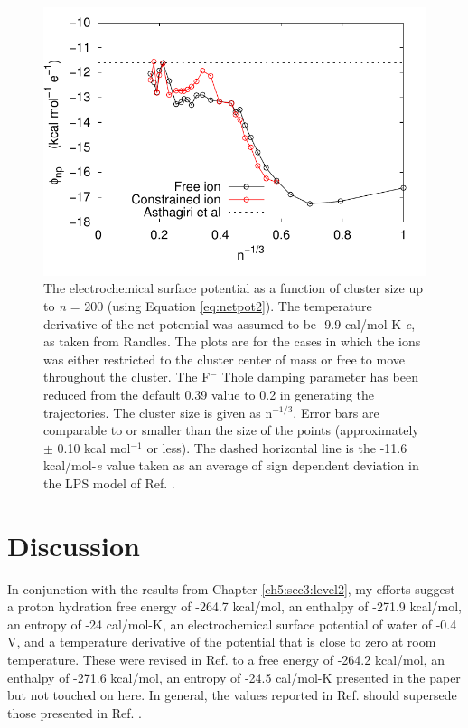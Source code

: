 \begin{cpa}
\begin{figure}
 \begin{center}
  \includegraphics[width=0.98\linewidth]{images/cpa/net_pot-eps-converted-to.pdf}
 \end{center}
\caption[Net potential assuming experimental temperature derivative]{The electrochemical surface potential as a function of cluster size up to \emph{n} = 200 (using Equation 
\ref{eq:netpot2}). The temperature derivative of the net potential was assumed to be -9.9 cal/mol-K-\emph{e}, as taken from Randles\cite{randles1977structure}. The plots 
are for the cases in which the ions was either restricted to the cluster center of mass or free to move throughout the cluster. The F$^{-}$ Thole damping parameter has
been reduced from the default 0.39 value to 0.2 in generating the trajectories. The cluster size is given as n$^{-1/3}$. Error bars are comparable to or smaller than 
the size of the points (approximately $\pm$ 0.10 kcal mol$^{-1}$ or less). The dashed horizontal line is the -11.6 kcal/mol-\emph{e} value taken as an average of sign dependent
deviation in the LPS model of Ref. \cite{ashbaugh2008lps}.}
\label{fig:netpotlps}
\end{figure}

  \section{\label{ch5:sec4:level1}Discussion~}
  In conjunction with the results from Chapter \ref{ch5:sec3:level2}, my efforts suggest a proton hydration free energy of -264.7 kcal/mol, an enthalpy of -271.9 kcal/mol, an 
  entropy of -24 cal/mol-K, an electrochemical surface potential of water of -0.4 V, and a temperature derivative of the potential that is close to zero at room temperature. 
  These were revised in Ref. \cite{pollard2014cpa2} to a free energy of -264.2 kcal/mol, an enthalpy of -271.6 kcal/mol, an entropy of -24.5 cal/mol-K presented in the paper
  but not touched on here. In general, the values reported in Ref. \cite{pollard2014cpa2} should supersede those presented in Ref. \cite{pollard2014cpa1}.


\end{cpa}
